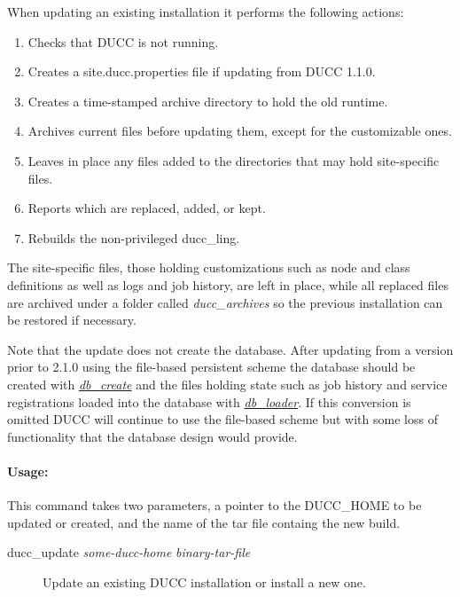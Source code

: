         When updating an existing installation it performs the following actions:
        \begin{enumerate}
          \item Checks that DUCC is not running.
          \item Creates a site.ducc.properties file if updating from DUCC 1.1.0.
          \item Creates a time-stamped archive directory to hold the old runtime.
          \item Archives current files before updating them, except for the customizable ones.
          \item Leaves in place any files added to the directories that may hold site-specific files.
          \item Reports which are replaced, added, or kept.
          \item Rebuilds the non-privileged ducc\_ling.
        \end{enumerate}

        The site-specific files, those holding customizations such as node and class definitions
        as well as logs and job history, are left in place, 
        while all replaced files are archived under a folder called {\em ducc\_archives} 
        so the previous installation can be restored if necessary.

        Note that the update does not create the database.  After updating from a version prior
        to 2.1.0 using the file-based persistent scheme the database should be created with
        \hyperref[subsec:admin.db-create]{\em db\_create} 
        and the files holding state such as job history and service registrations loaded into the database with
        \hyperref[subsec:admin.db-loader]{\em db\_loader}.
        If this conversion is omitted DUCC will continue to use the file-based scheme but with some
        loss of functionality that the database design would provide.
        
    \paragraph{Usage:}
        This command takes two parameters, a pointer to the DUCC\_HOME to be updated or created,
        and the name of the tar file containg the new build.
    \begin{description}
      \item[ducc\_update {\em some-ducc-home} {\em binary-tar-file}]
        Update an existing DUCC installation or install a new one.
    \end{description}

